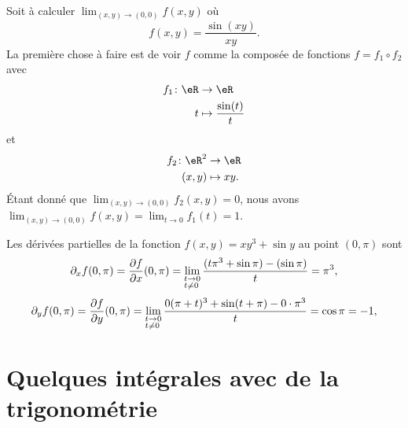 \begin{example}
	Soit à calculer $\lim_{(x,y)\to(0,0)}f(x,y)$ où
	\begin{equation}
		f(x,y)=\frac{ \sin(xy) }{ xy }.
	\end{equation}
	La première chose à faire est de voir $f$ comme la composée de fonctions $f=f_1\circ f_2$ avec
	\begin{equation}
		\begin{aligned}
			f_1\colon \eR & \to \eR                       \\
			t             & \mapsto \frac{ \sin(t) }{ t }
		\end{aligned}
	\end{equation}
	et
	\begin{equation}
		\begin{aligned}
			f_2\colon \eR^2 & \to \eR     \\
			(x,y)           & \mapsto xy.
		\end{aligned}
	\end{equation}
	Étant donné que $\lim_{(x,y)\to(0,0)}f_2(x,y)=0$, nous avons $\lim_{(x,y)\to(0,0)}f(x,y)=\lim_{t\to 0} f_1(t)=1$.
\end{example}

\begin{example}     \label{EXooETZYooYsKPDJ}
	Les dérivées partielles de la fonction $f(x,y)=xy^3+\sin y$ au point $(0,\pi)$ sont
	\[
		\partial_xf(0,\pi)=\frac{ \partial f }{ \partial x }(0,\pi)=\lim_{\begin{subarray}{l}
				t\to 0\\ t\neq 0
			\end{subarray}} \frac{(t\pi^3+\sin \pi)-(\sin \pi)}{t}= \pi^3,
	\]
	\[
		\partial_yf(0,\pi)=\frac{ \partial f }{ \partial y }(0,\pi)=\lim_{\begin{subarray}{l}
				t\to 0\\ t\neq 0
			\end{subarray}} \frac{0(\pi+t)^3+\sin (t+\pi)-0\cdot \pi^3}{t}= \cos \pi=-1,
	\]
\end{example}

\section{Quelques intégrales avec de la trigonométrie}
\label{SECooOOPPooZLbaEH}

